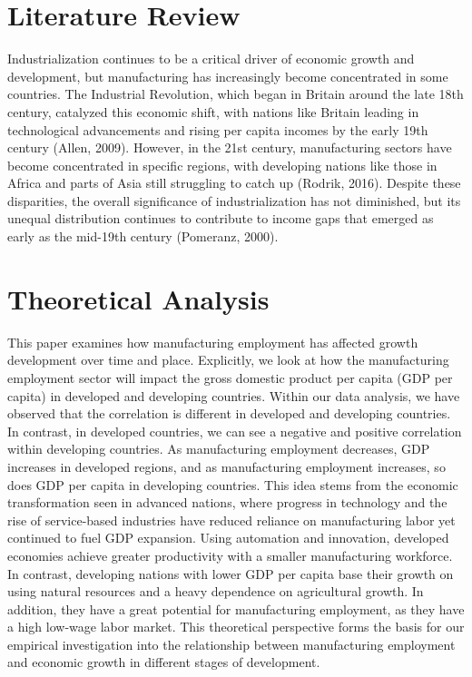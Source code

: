 \documentclass[12pt]{article}
\begin{document}
\section{Literature Review} \label{sec:literature}



Industrialization continues to be a critical driver of economic growth and development, but manufacturing has increasingly become concentrated in some countries. The Industrial Revolution, which began in Britain around the late 18th century, catalyzed this economic shift, with nations like Britain leading in technological advancements and rising per capita incomes by the early 19th century (Allen, 2009). However, in the 21st century, manufacturing sectors have become concentrated in specific regions, with developing nations like those in Africa and parts of Asia still struggling to catch up (Rodrik, 2016). Despite these disparities, the overall significance of industrialization has not diminished, but its unequal distribution continues to contribute to income gaps that emerged as early as the mid-19th century (Pomeranz, 2000).

\section{Theoretical Analysis}
\label{sec:theory}
This paper examines how manufacturing employment has affected growth development over time and place. Explicitly, we look at how the manufacturing employment sector will impact the gross domestic product per capita (GDP per capita) in developed and developing countries. Within our data analysis, we have observed that the correlation is different in developed and developing countries. In contrast, in developed countries, we can see a negative and positive correlation within developing countries. As manufacturing employment decreases, GDP increases in developed regions, and as manufacturing employment increases, so does GDP per capita in developing countries. This idea stems from the economic transformation seen in advanced nations, where progress in technology and the rise of service-based industries have reduced reliance on manufacturing labor yet continued to fuel GDP expansion. Using automation and innovation, developed economies achieve greater productivity with a smaller manufacturing workforce. In contrast, developing nations with lower GDP per capita base their growth on using natural resources and a heavy dependence on agricultural growth. In addition, they have a great potential for manufacturing employment, as they have a high low-wage labor market. This theoretical perspective forms the basis for our empirical investigation into the relationship between manufacturing employment and economic growth in different stages of development.
\end{document}
